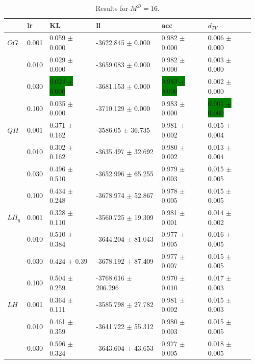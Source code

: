 \documentclass[shortabstract]{iithesis}
\begin{document}
\begin{table}[!ht]
\centering
\caption{Results for $M^{\mathcal D}=16$.}
\vspace{5mm}
\begin{tabular}{llllll}  \hline
& lr &   KL &                      ll &               acc &              $d_{TV}$ \\ \hline
$OG$ & 0.001 &    0.059 $\pm$ 0.000 &      -3622.845 $\pm$ 0.000 &    0.982 $\pm$ 0.000 &    0.006 $\pm$ 0.000 \\
        & 0.010 &    0.029 $\pm$ 0.000 &      -3659.083 $\pm$ 0.000 &    0.982 $\pm$ 0.000 &    0.003 $\pm$ 0.000 \\
        & 0.030 &    \colorbox{green}{0.024 $\pm$ 0.000} &      -3681.153 $\pm$ 0.000 &    \colorbox{green}{0.983 $\pm$ 0.000} &    0.002 $\pm$ 0.000 \\
        & 0.100 &    0.035 $\pm$ 0.000 &      -3710.129 $\pm$ 0.000 &    0.983 $\pm$ 0.000 &    \colorbox{green}{0.001 $\pm$ 0.000} \\
$QH$ & 0.001 &  0.371 $\pm$ 0.162 &    -3586.05 $\pm$ 36.735 &  0.981 $\pm$ 0.002 &  0.015 $\pm$ 0.004 \\
        & 0.010 &  0.302 $\pm$ 0.162 &   -3635.497 $\pm$ 32.692 &   0.980 $\pm$ 0.002 &  0.013 $\pm$ 0.004 \\
        & 0.030 &   0.496 $\pm$ 0.510 &   -3652.996 $\pm$ 65.255 &  0.979 $\pm$ 0.003 &  0.015 $\pm$ 0.005 \\
        & 0.100 &  0.434 $\pm$ 0.248 &   -3678.974 $\pm$ 52.867 &  0.978 $\pm$ 0.005 &  0.015 $\pm$ 0.005 \\
$LH_q$ & 0.001 &   0.328 $\pm$ 0.110 &   -3560.725 $\pm$ 19.309 &  0.981 $\pm$ 0.001 &  0.014 $\pm$ 0.002 \\
        & 0.010 &   0.510 $\pm$ 0.384 &   -3644.204 $\pm$ 81.043 &  0.977 $\pm$ 0.005 &  0.016 $\pm$ 0.005 \\
        & 0.030 &   0.424 $\pm$ 0.39 &   -3678.192 $\pm$ 87.409 &  0.977 $\pm$ 0.007 &  0.015 $\pm$ 0.005 \\
        & 0.100 &  0.504 $\pm$ 0.259 &  -3768.616 $\pm$ 206.296 &    0.970 $\pm$ 0.010 &  0.017 $\pm$ 0.003 \\
$LH$ & 0.001 &  0.364 $\pm$ 0.111 &   -3585.798 $\pm$ 27.782 &  0.981 $\pm$ 0.002 &  0.015 $\pm$ 0.003 \\
        & 0.010 &  0.461 $\pm$ 0.359 &   -3641.722 $\pm$ 55.312 &   0.980 $\pm$ 0.003 &  0.015 $\pm$ 0.005 \\
        & 0.030 &  0.596 $\pm$ 0.324 &   -3643.604 $\pm$ 43.653 &  0.977 $\pm$ 0.005 &  0.018 $\pm$ 0.005 \\

\end{tabular}
\end{table}
\end{document}
